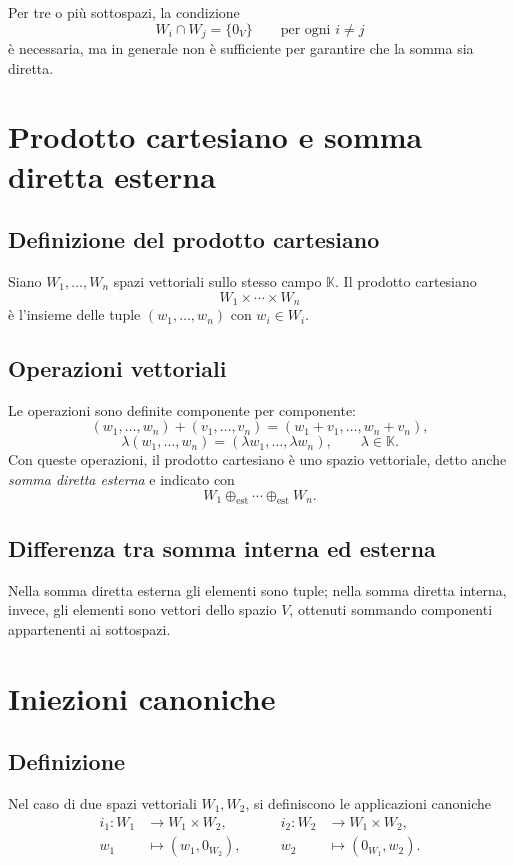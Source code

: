 \documentclass[11pt,a4paper]{article}
\theoremstyle{plain}
\theoremstyle{definition}
\theoremstyle{remark}
\begin{document}
Per tre o più sottospazi, la condizione
\[
W_i\cap W_j=\{0_V\}\qquad\text{per ogni }i\ne j
\]
è necessaria, ma in generale non è sufficiente per garantire che la somma sia diretta.

\section{Prodotto cartesiano e somma diretta esterna}

\subsection{Definizione del prodotto cartesiano}

Siano $W_1,\ldots,W_n$ spazi vettoriali sullo stesso campo $\mathbb K$. Il prodotto cartesiano
\[
W_1\times\cdots\times W_n
\]
è l'insieme delle tuple $(w_1,\ldots,w_n)$ con $w_i\in W_i$.

\subsection{Operazioni vettoriali}

Le operazioni sono definite componente per componente:
\[
(w_1,\ldots,w_n)+(v_1,\ldots,v_n)
=(w_1+v_1,\ldots,w_n+v_n),
\]
\[
\lambda(w_1,\ldots,w_n)
=(\lambda w_1,\ldots,\lambda w_n),
\qquad \lambda\in\mathbb K.
\]
Con queste operazioni, il prodotto cartesiano è uno spazio vettoriale, detto anche \emph{somma diretta esterna} e indicato con
\[
W_1\oplus_{\mathrm{est}}\cdots\oplus_{\mathrm{est}}W_n.
\]

\subsection{Differenza tra somma interna ed esterna}

Nella somma diretta esterna gli elementi sono tuple; nella somma diretta interna, invece, gli elementi sono vettori dello spazio $V$, ottenuti sommando componenti appartenenti ai sottospazi.

\section{Iniezioni canoniche}

\subsection{Definizione}

Nel caso di due spazi vettoriali $W_1,W_2$, si definiscono le applicazioni canoniche
\[
\begin{aligned}
i_1:W_1&\longrightarrow W_1\times W_2,\\
w_1&\longmapsto (w_1,0_{W_2}),
\end{aligned}
\qquad
\begin{aligned}
i_2:W_2&\longrightarrow W_1\times W_2,\\
w_2&\longmapsto (0_{W_1},w_2).
\end{aligned}
\]
\end{document}
